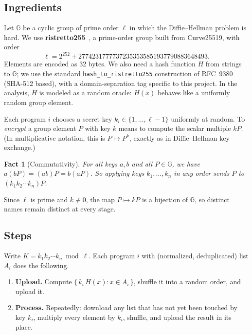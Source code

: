 \documentclass[11pt]{article}
\newtheorem*{fact}{Fact}
\newcommand{\G}{\mathbb{G}}
\begin{document}
\subsection{Ingredients}

Let $\G$ be a cyclic group of prime order $\ell$ in which the Diffie--Hellman problem is hard. We use
\textbf{ristretto255}~\cite{rfc9496}, a prime-order group built from Curve25519, with order
\[
  \ell = 2^{252} + 27742317777372353535851937790883648493 .
\]
Elements are encoded as 32 bytes.
We also need a hash function $H$ from strings to $\G$; we use the standard
\texttt{hash\_to\_ristretto255} construction of RFC~9380~\cite{rfc9380} (SHA-512 based), with a
domain-separation tag specific to this project. In the analysis, $H$ is modeled as a random
oracle: $H(x)$ behaves like a uniformly random group element.

Each program $i$ chooses a secret key $k_i \in \{1, \dots, \ell-1\}$ uniformly at random. To
\emph{encrypt} a group element $P$ with key $k$ means to compute the scalar multiple $kP$. (In
multiplicative notation, this is $P \mapsto P^{k}$, exactly as in Diffie--Hellman key exchange.)

\begin{fact}[Commutativity]
  For all keys $a,b$ and all $P \in \G$, we have $a(bP) = (ab)P = b(aP)$.
  So applying keys $k_1, \dots, k_n$ in \emph{any} order sends $P$ to $(k_1 k_2 \cdots k_n) P$.
\end{fact}

\noindent Since $\ell$ is prime and $k \not\equiv 0$, the map $P \mapsto kP$ is a bijection of $\G$, so
distinct names remain distinct at every stage.

\subsection{Steps}

Write $K = k_1 k_2 \cdots k_n \bmod \ell$. Each program $i$ with (normalized, deduplicated) list
$A_i$ does the following.

\begin{enumerate}
  \item \textbf{Upload.} Compute $\{\, k_i\, H(x) : x \in A_i \,\}$, shuffle it into a random order, and upload it.
  \item \textbf{Process.} Repeatedly: download any list that has not yet been touched by key $k_i$,
        multiply every element by $k_i$, shuffle, and upload the result in its place.
\end{enumerate}
\end{document}
